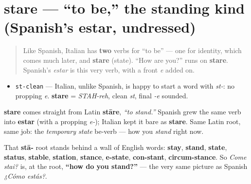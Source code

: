 \section[stare]{stare — \textquotedblleft{}to be,\textquotedblright{} the standing kind (Spanish's estar, undressed)}

\label{lesson:IT-C02-stare}



\begin{quote}
Like Spanish, Italian has \textbf{two} verbs for \textquotedblleft{}to be\textquotedblright{} — one for identity, which comes much later, and \textbf{stare} (state). \textquotedblleft{}How are you?\textquotedblright{} runs on \textbf{stare}. Spanish's \emph{estar} is this very verb, with a front \emph{e} added on.
\end{quote}

\begin{sounds}
\begin{itemize}
\raggedright
  \item \texttt{st-clean} — Italian, unlike Spanish, is happy to start a word with \emph{st-}: no propping \emph{e}. \textbf{stare} = \emph{STAH-reh}, clean \emph{st}, final \emph{-e} sounded.
\end{itemize}
\end{sounds}

\begin{cousinweb}
\textbf{stare} comes straight from Latin \textbf{stāre}, \emph{\textquotedblleft{}to stand.\textquotedblright{}} Spanish grew the same verb into \textbf{estar} (with a propping \emph{e-}); Italian kept it bare as \textbf{stare}. Same Latin root, same job: the \emph{temporary state} be-verb — how you \emph{stand} right now.

That \textbf{stā-} root stands behind a wall of English words: \textbf{stay}, \textbf{stand}, \textbf{state}, \textbf{status}, \textbf{stable}, \textbf{station}, \textbf{stance}, \textbf{e-state}, \textbf{con-stant}, \textbf{circum-stance}. So \emph{Come stai?} is, at the root, \textbf{\textquotedblleft{}how do you stand?\textquotedblright{}} — the very same picture as Spanish \emph{¿Cómo estás?}.
\end{cousinweb}

